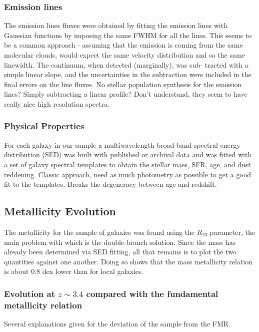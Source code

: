 \documentclass{literature}
\begin{document}
\subsubsection{Emission lines}
The emission lines fluxes were obtained by fitting the emission lines with Gaussian functions by imposing the same FWHM for all the lines. This seems to be a common approach - assuming that the emission is coming from the same molecular clouds, would expect the same velocity distribution and so the same linewidth. The continuum, when detected (marginally), was sub- tracted with a simple linear slope, and the uncertainties in the subtraction were included in the final errors on the line fluxes. No stellar population synthesis for the emission lines? Simply subtracting a linear profile? Don't understand, they seem to have really nice high resolution spectra. 
\subsubsection{Physical Properties}
For each galaxy in our sample a multiwavelength broad-band spectral energy distribution (SED) was built with published or archival data and was fitted with a set of galaxy spectral templates to obtain the stellar mass, SFR, age, and dust reddening. Classic approach, need as much photometry as possible to get a good fit to the templates. Breaks the degeneracy between age and redshift. 

\subsection{Metallicity Evolution}
The metallicity for the sample of galaxies was found using the $R_{23}$ parameter, the main problem with which is the double-branch solution. Since the mass has already been determined via SED fitting, all that remains is to plot the two quantities against one another. Doing so shows that the mass metallicity relation is about 0.8 dex lower than for local galaxies. 

\subsubsection{Evolution at \texorpdfstring{$z∼3.4$}{z equal 3.4} compared with the fundamental metallicity relation}
Several explanations given for the deviation of the sample from the FMR.
\end{document}

